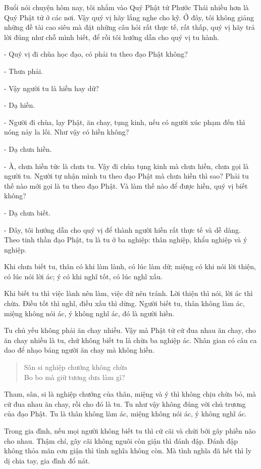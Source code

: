 \documentclass[
  12pt,
  oneside]{book}
\begin{document}
Buổi nói chuyện hôm nay, tôi nhắm vào Quý Phật tử Phước Thái nhiều hơn là Quý Phật tử ở các nơi. Vậy quý vị hãy lắng nghe cho kỹ. Ở đây, tôi không giảng những đề tài cao siêu mà đặt những câu hỏi rất thực tế, rất thấp, quý vị hãy trả lời đúng như chỗ mình biết, để rồi tôi hướng dẫn cho quý vị tu hành.

- Quý vị đi chùa học đạo, có phải tu theo đạo Phật không?

- Thưa phải.

- Vậy người tu là hiền hay dữ?

- Dạ hiền.

- Người đi chùa, lạy Phật, ăn chay, tụng kinh, nếu có người xúc phạm đến thì nóng nảy la lối. Như vậy có hiền không?

- Dạ chưa hiền.

- À, chưa hiền tức là chưa tu. Vậy đi chùa tụng kinh mà chưa hiền, chưa gọi là người tu. Người tự nhận mình tu theo đạo Phật mà chưa hiền thì sao? Phải tu thế nào mới gọi là tu theo đạo Phật. Và làm thế nào để được hiền, quý vị biết không?

- Dạ chưa biết.

- Đây, tôi hướng dẫn cho quý vị để thành người hiền rất thực tế và dễ dàng. Theo tinh thần đạo Phật, tu là tu ở ba nghiệp: thân nghiệp, khẩu nghiệp và ý nghiệp.

Khi chưa biết tu, thân có khi làm lành, có lúc làm dữ; miệng có khi nói lời thiện, có lúc nói lời ác; ý có khi nghĩ tốt, có lúc nghĩ xấu.

Khi biết tu thì việc lành nên làm, việc dữ nên tránh. Lời thiện thì nói, lời ác thì chừa. Điều tốt thì nghĩ, điều xấu thì dừng. Người biết tu, thân không làm ác, miệng không nói ác, ý không nghĩ ác, đó là người hiền.

Tu chủ yếu không phải ăn chay nhiều. Vậy mà Phật tử cứ đua nhau ăn chay, cho ăn chay nhiều là tu, chứ không biết tu là chừa ba nghiệp ác. Nhân gian có câu ca dao để nhạo báng người ăn chay mà không hiền.

\begin{quote}
Sân si nghiệp chướng không chừa\\
Bo bo mà giữ tương dưa làm gì?
\end{quote}

Tham, sân, si là nghiệp chướng của thân, miệng và ý thì không chịu chừa bỏ, mà cứ đua nhau ăn chay, rồi cho đó là tu. Tu như vậy không đúng với chủ trương của đạo Phật. Tu là thân không làm ác, miệng không nói ác, ý không nghĩ ác.

Trong gia đình, nếu mọi người không biết tu thì cứ cãi và chửi bới gây phiền não cho nhau. Thậm chí, gây cãi không nguôi còn giận thì đánh đập. Đánh đập không thỏa mãn cơn giận thì tình nghĩa không còn. Mà tình nghĩa đã hết thì ly dị chia tay, gia đình đổ nát.
\end{document}
